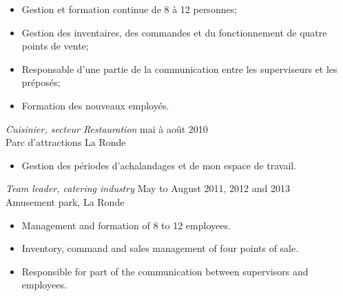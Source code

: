 \documentclass{res}
\newcommand{\inEnglish}[1]{#1}
\begin{document}
\begin{resume}
{	\vspace{0.05in}
	\begin{itemize} \itemsep -2pt
		\item Gestion et formation continue de 8 à 12 personnes;
		\item Gestion des inventaires, des commandes et du fonctionnement de quatre points de vente;
		\item Responsable d’une partie de la communication entre les superviseurs et les préposés;
		\item Formation des nouveaux employés.
	\end{itemize}


	{\sl Cuisinier, secteur Restauration}
		\hfill mai à août 2010 \\
	Parc d'attractions La Ronde

	\vspace{0.05in}
	\begin{itemize} \itemsep -2pt
		\item Gestion des périodes d’achalandages et de mon espace de travail.
	\end{itemize}
}

\inEnglish{
	{\sl Team leader, catering industry}
		\hfill May to August 2011, 2012 and 2013 \\
	Amusement park, La Ronde

	\vspace{0.05in}
	\begin{itemize} \itemsep -2pt
		\item Management and formation of 8 to 12 employees.
		\item Inventory, command and sales management of four points of sale.
		\item Responsible for part of the communication between supervisors and employees.
	\end{itemize}



}

\vspace{0.1in}

\end{resume}
\end{document}

